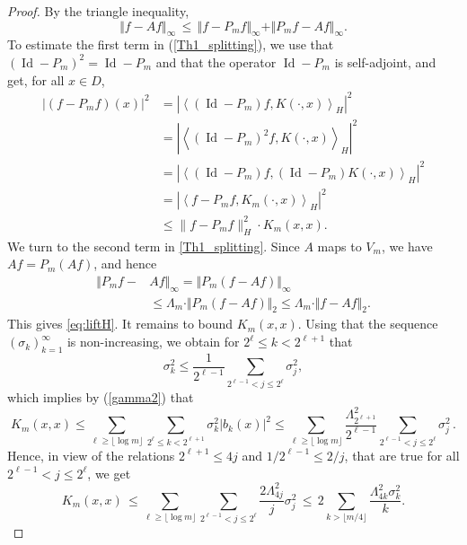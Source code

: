\documentclass[a4paper,12pt]{amsart}
\theoremstyle{definition}
\theoremstyle{remark}
\newcommand{\abs}[1]{\left|#1\right|}
\newcommand{\ipr}[2]{\left\langle#1,#2\right\rangle}
\DeclareMathOperator{\Id}{Id}
\begin{document}
 
  \begin{proof}
By the triangle inequality,
 \begin{equation}\label{Th1_splitting}
	\Vert f - A f \Vert_\infty
\,\le\, \Vert f - P_m f \Vert_\infty + \Vert P_m f - A f \Vert_\infty. 
\end{equation}
To estimate the first term in (\ref{Th1_splitting}), we 
use that $(\Id - P_m)^2 = \Id - P_m$ and that the operator $\Id - P_m$ is self-adjoint, 
and get, for all $x\in D$,
\begin{equation*}
	\begin{split}	\abs{(f - P_m f)(x)}^2  &
		= \abs{ \ipr{(\Id - P_m) f}{K(\cdot, x)}_H }^2\\
		&= \abs{ \ipr{(\Id - P_m)^2 f}{K(\cdot, x)}_H }^2
\\
&= \abs{ \ipr{(\Id - P_m) f}{(\Id - P_m) K(\cdot, x)}_H }^2\\
&= \abs{ \ipr{f - P_m f}{K_m(\cdot, x)}_H }^2\\
		&\leq
		\|f - P_m f\|_{H}^2 \cdot K_m(x,x).
	\end{split}
\end{equation*}	
We turn to the second term in \eqref{Th1_splitting}.
Since $A$ maps to $V_m$, we have $A f = P_m (A f)$, and hence
\begin{align*}%
\Vert P_m f - &A f \Vert_\infty  = \Vert P_m (f - A f) \Vert_\infty \\
&\leq \Lambda_m \cdot \Vert  P_m( f - A f) \Vert_{2}
\leq \Lambda_m \cdot \Vert  f - A f \Vert_{2}.
\end{align*}
This gives \eqref{eq:liftH}. It remains to bound $K_m(x,x)$.
Using that the sequence $( \sigma_k)_{k=1}^{\infty}$ is non-increasing, 
we obtain for $2^\ell \leq k < 2^{\ell+1}$ that 
$$
\sigma_k^2 \leq  \frac{1}{2^{\ell-1}} \sum\limits_{ 2^{\ell-1}< j \le 2^\ell}\sigma_j^2,
$$
which implies  {by (\ref{gamma2}) that}
\begin{equation*}
K_m(x,x)
		\le \sum_{\ell \geq \lfloor \log m \rfloor} \sum_{2^\ell \leq k < 2^{\ell+1}}
		\sigma_k^2 \abs{b_k(x)}^2
 \leq   \sum_{\ell \geq \lfloor \log m \rfloor}
		\frac{ \Lambda_{2^{\ell+1}}^2 }{2^{\ell-1}} \sum_{ 2^{\ell-1}< j \le 2^\ell}\sigma_j^2 \, .
\end{equation*}	
Hence, in view of the relations $2^{\ell+1} \leq 4j$ and $1/2^{\ell-1} \le 2/j$, that are true for all $2^{\ell-1}< j \le 2^\ell$, we get
\begin{equation*}%
K_m(x,x)
	\,\leq \sum_{\ell  \geq \lfloor \log m \rfloor} \sum_{ 2^{\ell-1}< j \le 2^\ell}  \frac{2 \Lambda_{4j}^2}{j} \sigma_j^2
	 \,\leq\, 2 \sum\limits_{k > \lfloor m/4 \rfloor}\frac{\Lambda_{4k}^2\sigma_k^2}{k}.
\end{equation*}
 \end{proof}
 
\end{document}
